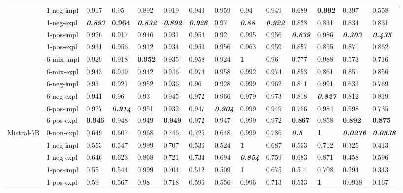 \begin{tabular}{ll|llll|llll|llll}
 & 1-neg-impl & 0.917 & 0.95 & 0.892 & 0.919 & 0.949 & 0.959 & 0.94 & 0.949 & 0.689 & \bfseries 0.992 & 0.397 & 0.558 \\
 & 1-neg-expl & \bfseries \itshape 0.893 & \bfseries 0.964 & \bfseries \itshape 0.832 & \bfseries \itshape 0.892 & \bfseries \itshape 0.926 & 0.97 & \bfseries \itshape 0.88 & \bfseries \itshape 0.922 & 0.828 & 0.831 & 0.834 & 0.831 \\
 & 1-pos-impl & 0.926 & 0.917 & 0.946 & 0.931 & 0.954 & 0.92 & 0.995 & 0.956 & \bfseries \itshape 0.639 & 0.986 & \bfseries \itshape 0.303 & \bfseries \itshape 0.435 \\
 & 1-pos-expl & 0.931 & 0.956 & 0.912 & 0.934 & 0.959 & 0.956 & 0.963 & 0.959 & 0.857 & 0.855 & 0.871 & 0.862 \\
 & 6-mix-impl & 0.929 & 0.918 & \bfseries 0.952 & 0.935 & 0.958 & 0.924 & \bfseries 1 & 0.96 & 0.777 & 0.988 & 0.573 & 0.716 \\
 & 6-mix-expl & 0.943 & 0.949 & 0.942 & 0.946 & 0.974 & 0.958 & 0.992 & 0.974 & 0.853 & 0.861 & 0.851 & 0.856 \\
 & 6-neg-impl & 0.93 & 0.921 & 0.952 & 0.936 & 0.96 & 0.928 & 0.999 & 0.962 & 0.811 & 0.991 & 0.633 & 0.769 \\
 & 6-neg-expl & 0.941 & 0.96 & 0.93 & 0.945 & 0.972 & 0.966 & 0.979 & 0.973 & 0.818 & \bfseries \itshape 0.827 & 0.812 & 0.819 \\
 & 6-pos-impl & 0.927 & \bfseries \itshape 0.914 & 0.951 & 0.932 & 0.947 & \bfseries \itshape 0.904 & 0.999 & 0.949 & 0.786 & 0.984 & 0.598 & 0.735 \\
 & 6-pos-expl & \bfseries 0.946 & 0.948 & 0.949 & \bfseries 0.949 & 0.972 & 0.947 & 0.999 & 0.972 & \bfseries 0.867 & 0.858 & \bfseries 0.892 & \bfseries 0.875 \\
\midrule
\multirow[t]{11}{*}{Mistral-7B} & 0-non-expl & 0.649 & 0.607 & 0.968 & 0.746 & 0.726 & 0.648 & 0.999 & 0.786 & \bfseries \itshape 0.5 & \bfseries 1 & \bfseries \itshape 0.0276 & \bfseries \itshape 0.0538 \\
 & 1-neg-impl & 0.553 & 0.547 & 0.999 & 0.707 & 0.536 & 0.524 & \bfseries 1 & 0.687 & 0.553 & 0.712 & 0.325 & 0.413 \\
 & 1-neg-expl & 0.646 & 0.623 & 0.868 & 0.721 & 0.734 & 0.694 & \bfseries \itshape 0.854 & 0.759 & 0.683 & 0.871 & 0.458 & 0.596 \\
 & 1-pos-impl & 0.55 & 0.544 & 0.999 & 0.704 & 0.512 & 0.509 & \bfseries 1 & 0.675 & 0.514 & 0.708 & 0.294 & 0.343 \\
 & 1-pos-expl & 0.59 & 0.567 & 0.98 & 0.718 & 0.596 & 0.556 & 0.996 & 0.713 & 0.533 & \bfseries 1 & 0.0938 & 0.167 \\

\end{tabular}
